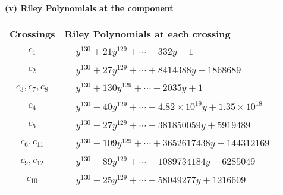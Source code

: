 \documentclass[1p]{elsarticle_modified}
\theoremstyle{definition}
\begin{document}
\newpage\renewcommand{\arraystretch}{1}
\flushleft \textbf{(v) Riley Polynomials at the component}\newline \\
\begin{tabular}{m{50pt}|m{274pt}}
Crossings & \hspace{64pt}Riley Polynomials at each crossing \\
\hline $$\begin{aligned}c_{1}\end{aligned}$$&$\begin{aligned}
&y^{130}+21 y^{129}+\cdots-332 y+1
\end{aligned}$\\
\hline $$\begin{aligned}c_{2}\end{aligned}$$&$\begin{aligned}
&y^{130}+27 y^{129}+\cdots+8414388 y+1868689
\end{aligned}$\\
\hline $$\begin{aligned}c_{3},c_{7},c_{8}\end{aligned}$$&$\begin{aligned}
&y^{130}+130 y^{129}+\cdots-2035 y+1
\end{aligned}$\\
\hline $$\begin{aligned}c_{4}\end{aligned}$$&$\begin{aligned}
&y^{130}-40 y^{129}+\cdots-4.82\times10^{19} y+1.35\times10^{18}
\end{aligned}$\\
\hline $$\begin{aligned}c_{5}\end{aligned}$$&$\begin{aligned}
&y^{130}-27 y^{129}+\cdots-381850059 y+5919489
\end{aligned}$\\
\hline $$\begin{aligned}c_{6},c_{11}\end{aligned}$$&$\begin{aligned}
&y^{130}-109 y^{129}+\cdots+3652617438 y+144312169
\end{aligned}$\\
\hline $$\begin{aligned}c_{9},c_{12}\end{aligned}$$&$\begin{aligned}
&y^{130}-89 y^{129}+\cdots-1089734184 y+6285049
\end{aligned}$\\
\hline $$\begin{aligned}c_{10}\end{aligned}$$&$\begin{aligned}
&y^{130}-25 y^{129}+\cdots-58049277 y+1216609
\end{aligned}$\\
\hline
\end{tabular}\\~\\
\end{document}
